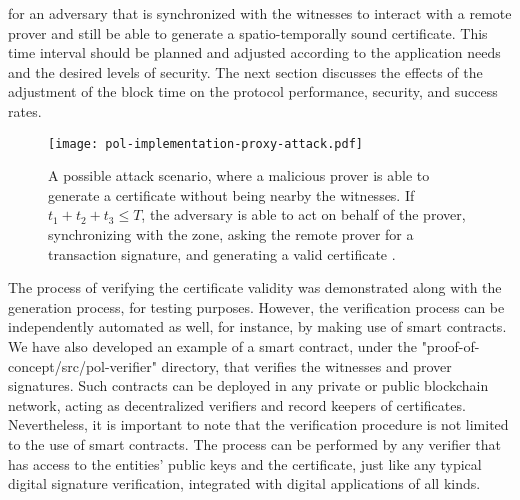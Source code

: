 for an adversary that is synchronized with the witnesses to interact with a remote prover and still be able to generate a spatio-temporally sound \pol{} certificate. This time interval should be planned and adjusted according to the application needs and the desired levels of security. The next section discusses the effects of the adjustment of the block time on the protocol performance, security, and success rates.

\begin{figure}[h!]
    \begin{center}
    \texttt{[image: pol-implementation-proxy-attack.pdf]}
    \caption{A possible attack scenario, where a malicious prover is able to generate a \pol{} certificate without being nearby the witnesses. If $t_1 + t_2 + t_3 \leq T$, the adversary is able to act on behalf of the prover, synchronizing with the zone, asking the remote prover for a transaction signature, and generating a valid certificate \cite{nosouhi2020blockchain}.}
    \label{fig:pol-implementation:overview-proxy-wormhole}
    \end{center}
\end{figure}

The process of verifying the certificate validity was demonstrated along with the generation process, for testing purposes. However, the verification process can be independently automated as well, for instance, by making use of smart contracts. We have also developed an example of a smart contract, under the "proof-of-concept/src/pol-verifier" directory, that verifies the witnesses and prover signatures. Such contracts can be deployed in any private or public blockchain network, acting as decentralized verifiers and record keepers of \pol{} certificates. Nevertheless, it is important to note that the verification procedure is not limited to the use of smart contracts. The process can be performed by any verifier that has access to the entities' public keys and the \pol{} certificate, just like any typical digital signature verification, integrated with digital applications of all kinds.





